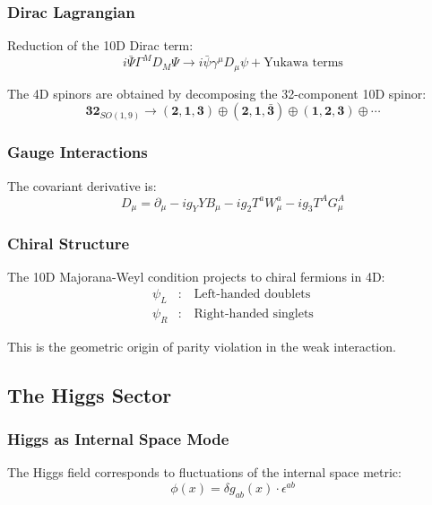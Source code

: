 \subsubsection{Dirac Lagrangian}

Reduction of the 10D Dirac term:
\begin{equation}
    i\bar{\Psi}\Gamma^M D_M \Psi \to i\bar{\psi}\gamma^\mu D_\mu \psi + \text{Yukawa terms}
\end{equation}

The 4D spinors are obtained by decomposing the 32-component 10D spinor:
\begin{equation}
    \mathbf{32}_{SO(1,9)} \to (\mathbf{2}, \mathbf{1}, \mathbf{3}) \oplus (\mathbf{2}, \mathbf{1}, \bar{\mathbf{3}}) \oplus (\mathbf{1}, \mathbf{2}, \mathbf{3}) \oplus \cdots
\end{equation}

\subsubsection{Gauge Interactions}

The covariant derivative is:
\begin{equation}
    D_\mu = \partial_\mu - ig_Y Y B_\mu - ig_2 T^a W_\mu^a - ig_3 T^A G_\mu^A
\end{equation}

\subsubsection{Chiral Structure}

The 10D Majorana-Weyl condition projects to chiral fermions in 4D:
\begin{align}
    \psi_L &: \quad \text{Left-handed doublets} \\
    \psi_R &: \quad \text{Right-handed singlets}
\end{align}

This is the geometric origin of parity violation in the weak interaction.

\subsection{The Higgs Sector}

\subsubsection{Higgs as Internal Space Mode}

The Higgs field corresponds to fluctuations of the internal space metric:
\begin{equation}
    \phi(x) = \delta g_{ab}(x) \cdot \epsilon^{ab}
\end{equation}

